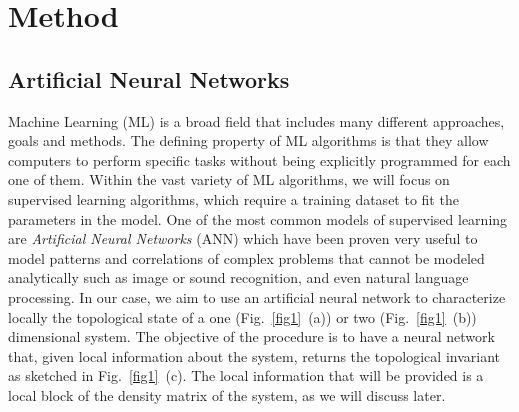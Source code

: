 \section{Method}
\label{sec:met}
\subsection{Artificial Neural Networks}
\label{sec:NN}
Machine Learning (ML) is a broad field that includes many different approaches,
goals and methods.\cite{Solomonoff1957}
The defining property of ML algorithms is that they allow computers to perform
specific tasks without being explicitly programmed for each one of
them.\cite{Samuel1959} Within the vast variety of ML algorithms, we will focus
on supervised learning algorithms, which require a training dataset to fit the
parameters in the model. One of the most common models of supervised learning are
\emph{Artificial Neural Networks} (ANN) which have been proven very useful to
model patterns and correlations of complex problems that cannot be modeled
analytically such as image or sound
recognition,\cite{alexnet2012,Dede20107,Lecun1998} and even natural language
processing.\cite{Goldberg2015,Bengio2003}
In our case, we aim to use an artificial neural network to characterize
locally the topological state of a one (Fig.~\ref{fig1}~(a)) or two
(Fig.~\ref{fig1}~(b)) dimensional system. The objective of the procedure
is to have a neural network that, given local information about the system,
returns the topological invariant as sketched in Fig.~\ref{fig1}~(c).
The local information that will be provided is a local block of the density
matrix of the system, as we will discuss later.

